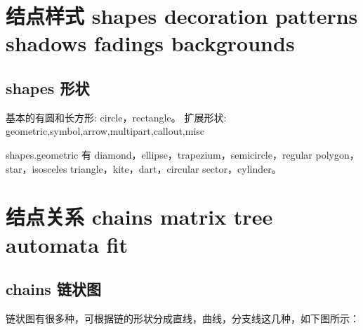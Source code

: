 \section{结点样式 shapes decoration patterns shadows fadings backgrounds}

\subsection{shapes 形状}
基本的有圆和长方形: circle，rectangle。
扩展形状: geometric,symbol,arrow,multipart,callout,misc

shapes.geometric 有 diamond，ellipse，trapezium，semicircle，regular polygon，star，isosceles triangle，kite，dart，circular sector，cylinder。
\begin{tikzpicture}


\end{tikzpicture}



\section{结点关系 chains matrix tree automata fit}

\subsection{chains 链状图}

\begin{cmd}[label= pgf 链状图加载库]
  \usetikzlibrary{chains} %
\end{cmd}
链状图有很多种，可根据链的形状分成直线，曲线，分支线这几种，如下图所示：


